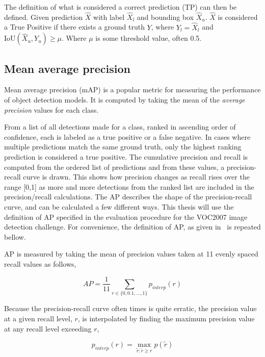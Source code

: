 The definition of what is considered a correct prediction (TP) can then be defined.
Given prediction \(\hat{X}\) with label \(\hat{X}_l\) and bounding box \(\hat{X}_u\). \(\hat{X}\) is considered a True Positive if there exists a ground truth \(Y\), where \(Y_{l}=\hat{X}_l\) and \(\text{IoU}(\hat{X}_u, Y_{u})\ge \mu \).
Where \( \mu \) is some threshold value, often 0.5.

\subsection{Mean average precision}
Mean average precision (mAP) is a popular metric for measuring the performance of object detection models.
It is computed by taking the mean of the \textit{average precision} values for each class.

From a list of all detections made for a class, ranked in ascending order of confidence, each is labeled as a true positive or a false negative.
In cases where multiple predictions match the same ground truth, only the highest ranking prediction is considered a true positive.
The cumulative precision and recall is computed from the ordered list of predictions and from these values, a precision-recall curve is drawn.
This shows how precision changes as recall rises over the range [0,1] as more and more detections from the ranked list are included in the precision/recall calculations.
The AP describes the shape of the precision-recall curve, and can be calculated a few different ways.
This thesis will use the definition of AP specified in the evaluation procedure for the VOC2007 image detection challenge.
For convenience, the definition of AP, as given in\ \textcite{everingham2010pascal} is repeated bellow.

AP is measured by taking the mean of precision values taken at 11 evenly spaced recall values as follows,

\begin{equation}\label{eq:average-precision}
  AP=\frac{1}{11} \sum_{r\in \{0,0.1,\dots,1\}}p_{interp}(r)
\end{equation}

Because the precision-recall curve often times is quite erratic, the precision value at a given recall level, \(r\), is interpolated by finding the maximum precision value at any recall level exceeding \(r\),

\begin{equation*}
  p_{interp}(r)=\max_{\tilde{r}:\tilde{r}\geq r}p(\tilde{r})
\end{equation*}

